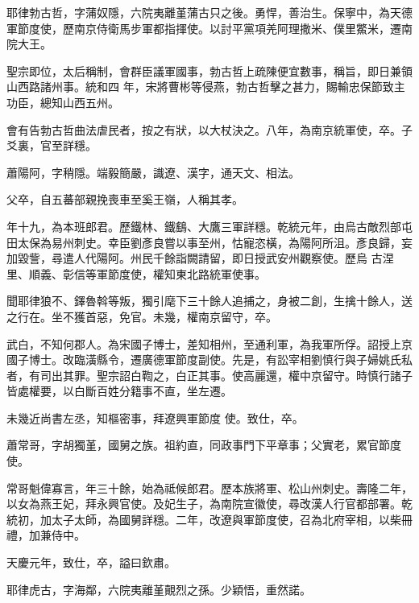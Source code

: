 \begin{pinyinscope}
 耶律勃古哲，字蒲奴隱，六院夷離堇蒲古只之後。勇悍，善治生。保寧中，為天德軍節度使，歷南京侍衛馬步軍都指揮使。以討平黨項羌阿理撒米、僕里鱉米，遷南院大王。



 聖宗即位，太后稱制，會群臣議軍國事，勃古哲上疏陳便宜數事，稱旨，即日兼領山西路諸州事。統和四
 年，宋將曹彬等侵燕，勃古哲擊之甚力，賜輸忠保節致主功臣，總知山西五州。



 會有告勃古哲曲法虐民者，按之有狀，以大杖決之。八年，為南京統軍使，卒。子爻裏，官至詳穩。



 蕭陽阿，字稍隱。端毅簡嚴，識遼、漢字，通天文、相法。



 父卒，自五蕃部親挽喪車至奚王嶺，人稱其孝。



 年十九，為本班郎君。歷鐵林、鐵鷂、大鷹三軍詳穩。乾統元年，由烏古敵烈部屯田太保為易州刺史。幸臣劉彥良嘗以事至州，怙寵恣橫，為陽阿所沮。彥良歸，妄加毀訾，尋遣人代陽阿。州民千餘詣闕請留，即日授武安州觀察使。歷烏
 古涅里、順義、彰信等軍節度使，權知東北路統軍使事。



 聞耶律狼不、鐸魯斡等叛，獨引麾下三十餘人追捕之，身被二創，生擒十餘人，送之行在。坐不獲首惡，免官。未幾，權南京留守，卒。



 武白，不知何郡人。為宋國子博士，差知相州，至通利軍，為我軍所俘。詔授上京國子博士。改臨潢縣令，遷廣德軍節度副使。先是，有訟宰相劉慎行與子婦姚氏私者，有司出其罪。聖宗詔白鞫之，白正其事。使高麗還，權中京留守。時慎行諸子皆處權要，以白斷百姓分籍事不直，坐左遷。



 未幾近尚書左丞，知樞密事，拜遼興軍節度
 使。致仕，卒。



 蕭常哥，字胡獨堇，國舅之族。祖約直，同政事門下平章事；父實老，累官節度使。



 常哥魁偉寡言，年三十餘，始為祗候郎君。歷本族將軍、松山州刺史。壽隆二年，以女為燕王妃，拜永興官使。及妃生子，為南院宣徽使，尋改漢人行官都部署。乾統初，加太子太師，為國舅詳穩。二年，改遼與軍節度使，召為北府宰相，以柴冊禮，加兼侍中。



 天慶元年，致仕，卒，謚曰欽肅。



 耶律虎古，字海鄰，六院夷離堇覿烈之孫。少穎悟，重然諾。




\end{pinyinscope}
